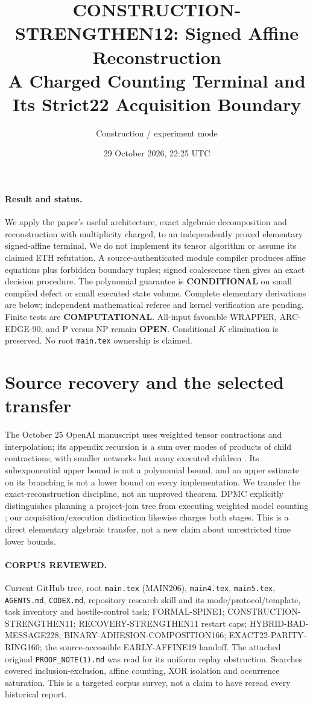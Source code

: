 \documentclass[11pt]{article}
\title{CONSTRUCTION-STRENGTHEN12: Signed Affine Reconstruction\\
A Charged Counting Terminal and Its Strict22 Acquisition Boundary}
\author{Construction / experiment mode}
\date{29 October 2026, 22:25 UTC}
\begin{document}
\sloppy\maketitle

\paragraph{Result and status.}
We apply the paper's useful architecture, exact algebraic decomposition and
reconstruction with multiplicity charged, to an independently proved elementary
signed-affine terminal. We do not implement its tensor algorithm or assume its
claimed ETH refutation. A source-authenticated module compiler produces affine
equations plus forbidden boundary tuples; signed coalescence then gives an exact
decision procedure. The polynomial guarantee is \textbf{CONDITIONAL} on small
compiled defect or small executed state volume. Complete elementary derivations
are below; independent mathematical referee and kernel verification are pending.
Finite tests are \textbf{COMPUTATIONAL}. All-input favorable WRAPPER,
ARC-EDGE-90, and P versus NP remain \textbf{OPEN}. Conditional $K$ elimination
is preserved. No root \texttt{main.tex} ownership is claimed.

\section{Source recovery and the selected transfer}
The October 25 OpenAI manuscript uses weighted tensor contractions and
interpolation; its appendix recursion is a sum over modes of products of
child contractions, with smaller networks but many executed children
\cite{eth}. Its subexponential upper bound is not a polynomial bound, and
an upper estimate on its branching is not a lower bound on every implementation.
We transfer the exact-reconstruction discipline, not an unproved theorem.
DPMC explicitly distinguishes planning a project-join tree from executing
weighted model counting \cite{dpmc}; our acquisition/execution distinction
likewise charges both stages. This is a direct elementary algebraic transfer,
not a new claim about unrestricted time lower bounds.

\paragraph{CORPUS REVIEWED.}
Current GitHub tree, root \texttt{main.tex} (MAIN206), \texttt{main4.tex},
\texttt{main5.tex}, \texttt{AGENTS.md}, \texttt{CODEX.md}, repository research
skill and its mode/protocol/template, task inventory and hostile-control task;
FORMAL-SPINE1; CONSTRUCTION-STRENGTHEN11; RECOVERY-STRENGTHEN11 restart caps;
HYBRID-BAD-MESSAGE228; BINARY-ADHESION-COMPOSITION166;
EXACT22-PARITY-RING160; the source-accessible EARLY-AFFINE19 handoff.
The attached original \texttt{PROOF\_NOTE(1).md} was read for its uniform
replay obstruction. Searches covered inclusion-exclusion, affine counting,
XOR isolation and occurrence saturation. This is a targeted corpus survey,
not a claim to have reread every historical report.
\end{document}
